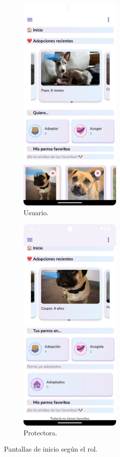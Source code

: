 \documentclass[a4paper, 12pt]{article}
\begin{document}
\begin{figure}[H]
   	\begin{subfigure}{0.48\textwidth}
		\begin{center}
			{\includegraphics[width=5cm]{app/UserHome.png}\par}
			\caption{Usuario.}
		\end{center}  
	\end{subfigure}\hfill
   	\begin{subfigure}{0.48\textwidth}
		\begin{center}
			{\includegraphics[width=5cm]{app/CompanyHome.png}\par}
			\caption{Protectora.}
		\end{center}  
	\end{subfigure}\hfill
	\caption{Pantallas de inicio según el rol.}
\end{figure}
\end{document}
